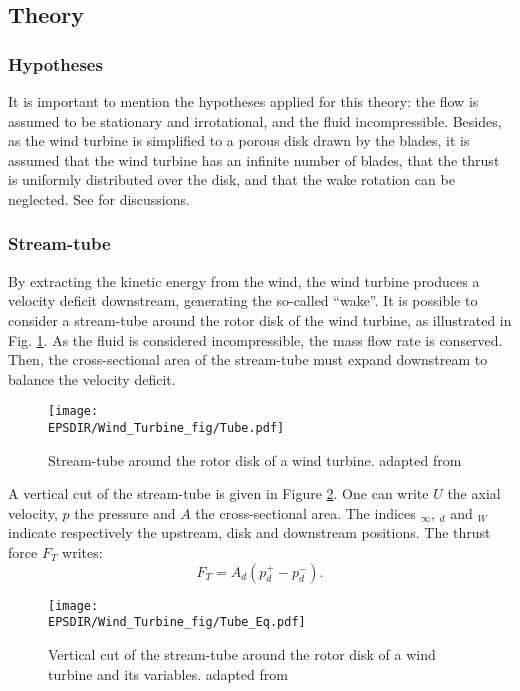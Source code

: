 \subsection{Theory}
\subsubsection*{Hypotheses}
\label{sss:ADNRhyp}
It is important to mention the hypotheses applied for this theory: the flow is assumed to be stationary and irrotational, and the fluid incompressible. Besides, as the wind turbine is simplified to a porous disk drawn by the blades, it is assumed that the wind turbine has an infinite number of blades, that the thrust is uniformly distributed over the disk, and that the wake rotation can be neglected. See \cite{joulin2019modelisation} for discussions.

	
		\subsubsection*{Stream-tube}
				\label{sss:ADTubeC}

By extracting the kinetic energy from the wind, the wind turbine produces a velocity deficit downstream, generating the so-called ``wake''. It is possible to consider a stream-tube around the rotor disk of the wind turbine, as illustrated in Fig. \ref{fig:BEMTube3D}. As the fluid is considered incompressible, the mass flow rate is conserved. Then, the cross-sectional area of the stream-tube must expand downstream to balance the velocity deficit.
				
\begin{figure}[h]
\centering
\texttt{[image: \\EPSDIR/Wind\_Turbine\_fig/Tube.pdf]}
\caption{Stream-tube around the rotor disk of a wind turbine. \cite{joulin2019modelisation} adapted from \cite{burton2001wind}}  
\label{fig:BEMTube3D}
\end{figure}		
		
\medbreak
A vertical cut of the stream-tube is given in Figure \ref{fig:BEMTubeEq}. One can write $U$ the axial velocity, $p$ the pressure and $A$ the cross-sectional area. The indices $_\infty$, $_d$ and $_W$ indicate respectively the upstream, disk and downstream positions. The thrust force $F_T$ writes:
\begin{equation}
\label{eq:FpDef}
F_T = A_d (p_d^+ - p_d^-).
\end{equation}		
\medbreak
\begin{figure}[h]
\centering
\texttt{[image: \\EPSDIR/Wind\_Turbine\_fig/Tube\_Eq.pdf]}
\caption{Vertical cut of the stream-tube around the rotor disk of a wind turbine and its variables. \cite{joulin2019modelisation} adapted from \cite{burton2001wind}}  
\label{fig:BEMTubeEq}
\end{figure}
\medbreak
	
